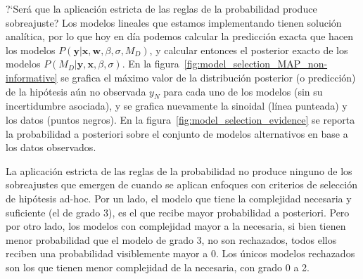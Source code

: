 \documentclass[a4paper,11pt]{book}
\theoremstyle{definition}
\begin{document}
%
%



?`Ser\'a que la aplicaci\'on estricta de las reglas de la probabilidad produce sobreajuste?
%
Los modelos lineales que estamos implementando tienen soluci\'on anal\'itica, por lo que hoy en d\'ia podemos calcular la predicci\'on exacta que hacen los modelos $P(\bm{y}|\bm{x}, \bm{w}, \beta, \sigma, M_D)$, y calcular entonces el posterior exacto de los modelos $P(M_D|\bm{y},\bm{x}, \beta, \sigma)$.
%
En la figura~\ref{fig:model_selection_MAP_non-informative} se grafica el m\'aximo valor de la distribuci\'on posterior (o predicci\'on) de la hip\'otesis a\'un no observada $y_N$ para cada uno de los modelos (sin su incertidumbre asociada), y se grafica nuevamente la sinoidal (l\'inea punteada) y los datos (puntos negros).
%
En la figura~\ref{fig:model_selection_evidence} se reporta la probabilidad a posteriori sobre el conjunto de modelos alternativos en base a los datos observados.


La aplicaci\'on estricta de las reglas de la probabilidad no produce ninguno de los sobreajustes que emergen de cuando se aplican enfoques con criterios de selecci\'on de hip\'otesis ad-hoc.
%
Por un lado, el modelo que tiene la complejidad necesaria y suficiente (el de grado 3), es el que recibe mayor probabilidad a posteriori.
%
Pero por otro lado, los modelos con complejidad mayor a la necesaria, si bien tienen menor probabilidad que el modelo de grado 3, no son rechazados, todos ellos reciben una probabilidad visiblemente mayor a 0.
%
Los \'unicos modelos rechazados son los que tienen menor complejidad de la necesaria, con grado 0 a 2.
\end{document}
